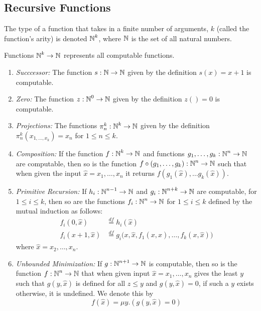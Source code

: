 \subsection{Recursive Functions}\label{subsec:Recursive_Functions}
The type of a function that takes in a finite number of arguments, $k$ (called the function's arity) is denoted $\operatorname{\mathbb{N}}^{k}$, where $\operatorname{\mathbb{N}}$ is the set of all natural numbers.

Functions $\operatorname{\mathbb{N}}^{k} \rightarrow \operatorname{\mathbb{N}}$ represents all computable functions.
\begin{enumerate}[noitemsep]
\item \emph{Succcessor:} The function $s : \operatorname{\mathbb{N}} \rightarrow \operatorname{\mathbb{N}}$ given by the definition $s(x) = x + 1$ is computable.
\item \emph{Zero:} The function $z : \operatorname{\mathbb{N}}^{0} \rightarrow \operatorname{\mathbb{N}}$ given by the definition $z() = 0$ is computable.
\item \emph{Projections:} The functions $\pi_{n}^{k} : \operatorname{\mathbb{N}}^{k} \rightarrow \operatorname{\mathbb{N}}$ given by the definition $\pi_{n}^{k}(x_{1, \ldots, x_{k}}) = x_{n}$ for $1 \leq n \leq k$.
\item \emph{Composition:} If the function $f : \operatorname{\mathbb{N}}^{k} \rightarrow \operatorname{\mathbb{N}}$ and functions $g_{1}, \ldots, g_{k} : \operatorname{\mathbb{N}}^{n} \rightarrow \operatorname{\mathbb{N}}$ are computable, then so is the function $f \circ (g_{1}, \ldots, g_{k}) : \operatorname{\mathbb{N}}^{n} \rightarrow \operatorname{\mathbb{N}}$ such that when given the input $\hat{x} = x_{1}, \ldots, x_{n}$ it returns $f(g_{1}(\hat{x}), \ldots g_{k}(\hat{x}))$.
\item \emph{Primitive Recursion:} If $h_{i} : \operatorname{\mathbb{N}}^{n-1} \rightarrow \operatorname{\mathbb{N}}$ and $g_{i} : \operatorname{\mathbb{N}}^{n+k} \rightarrow \operatorname{\mathbb{N}}$ are computable, for $1 \leq i \leq k$, then so are the functions $f_{i} : \operatorname{\mathbb{N}}^{n} \rightarrow \operatorname{\mathbb{N}}$ for $1 \leq i \leq k$ defined by the mutual induction as follows:
  \begin{align*}
    f_{i}(0, \hat{x}) &\overset{df}{=} h_{i}(\hat{x}) \\
    f_{i}(x+1, \hat{x}) &\overset{df}{=} g_{i} \bigl( x, \hat{x}, f_{1}(x, \hat{x}), \ldots, f_{k}(x, \hat{x}) \bigr)
  \end{align*}
  where $\hat{x} = x_{2}, \ldots, x_{n}$.
\item \emph{Unbounded Minimization:} If $g : \operatorname{\mathbb{N}}^{n+1} \rightarrow \operatorname{\mathbb{N}}$ is computable, then so is the function $f : \operatorname{\mathbb{N}}^{n} \rightarrow \operatorname{\mathbb{N}}$ that when given input $\hat{x} = x_{1}, \ldots, x_{n}$ gives the least $y$ such that $g(y, \hat{x})$ is defined for all $z \leq y$ and $g(y, \hat{x}) = 0$, if such a $y$ exists otherwise, it is undefined.
  We denote this by
  \begin{equation*}
    f(\hat{x}) = \mu y. (g (y, \hat{x}) = 0)
  \end{equation*}
\end{enumerate}


